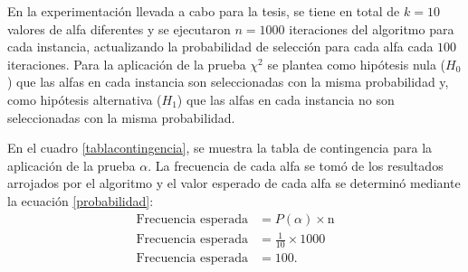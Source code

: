 \documentclass{article}
\begin{document}
En la experimentación llevada a cabo para la tesis, se tiene en total de $k=10$ valores de alfa diferentes y se ejecutaron $n=1000$ iteraciones del algoritmo para cada instancia, actualizando la probabilidad de selección para cada alfa cada $100$ iteraciones. Para la aplicación de la prueba $\chi^2$ se plantea como hipótesis nula ($H_{0}$) que las alfas en cada instancia son seleccionadas con la misma probabilidad y, como hipótesis alternativa ($H_{1}$) que las alfas en cada instancia no son seleccionadas con la misma probabilidad.

En el cuadro \ref{tablacontingencia}, se muestra la tabla de contingencia para la aplicación de la prueba $\alpha$. La frecuencia de cada alfa se tomó de los resultados arrojados por el algoritmo y el valor esperado de cada alfa se determinó mediante la ecuación \ref{probabilidad}:
\begin{align} 
  \text{Frecuencia esperada} & = P(\alpha) \times \text{n} \label{probabilidad} \\ 
    \text{Frecuencia esperada} & = \frac{1}{10} \times 1000 \\  \nonumber
    \text{Frecuencia esperada} & = 100. \\  \nonumber
\end{align}
\end{document}
